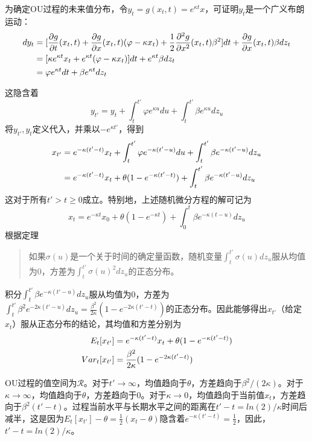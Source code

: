 \documentclass[UTF8]{ctexart}
\begin{document}
为确定OU过程的未来值分布，令$y_t=g(x_t,t)=e^{\kappa t}x$，可证明$y_t$是一个广义布朗运动：
\begin{align}
dy_t 
&=[\frac{\partial g}{\partial t}(x_t,t)+\frac{\partial g}{\partial x}(x_t,t)(\varphi-\kappa x_t)+\frac{1}{2} \frac{\partial^2 g}{\partial x^2}(x_t,t)\beta^2]dt+\frac{\partial g}{\partial x}(x_t,t)\beta dz_t \notag \\
&=[\kappa e^{\kappa t} x_t+e^{\kappa t}(\varphi-\kappa x_t)]dt+e^{\kappa t}\beta dz_t \notag  \\
&=\varphi e^{\kappa t} dt+\beta e^{\kappa t} dz_t \notag
\end{align}

这隐含着
$$y_{t'}=y_t+\int_t^{t'}\varphi e^{\kappa u}du +\int_t^{t'}\beta e^{\kappa u}dz_u$$
将$y_{t'},y_t$定义代入，并乘以$-e^{\kappa t'}$，得到
\begin{align}	
x_{t'}
&=e^{-\kappa (t'-t)}x_t+\int_t^{t'}\varphi e^{-\kappa (t'-u)}du+\int_t^{t'}\beta e^{-\kappa (t'-u)}dz_u
 \notag \\
&=e^{-\kappa (t'-t)}x_t+\theta(1-e^{-\kappa (t'-t)})+\int_t^{t'}\beta e^{-\kappa (t'-u)}dz_u
\notag
\end{align}
这对于所有$t' > t \geqslant 0$成立。特别地，上述随机微分方程的解可记为
$$x_t=e^{-\kappa t}x_0+\theta(1-e^{-\kappa t})+\int_0^t \beta e^{-\kappa (t-u)}dz_u$$
根据定理
\begin{quote}
\kaishu
如果$\sigma(u)$是一个关于时间的确定量函数，随机变量$\int_t^{t'}\sigma(u) dz_u$服从均值为0，方差为$\int_t^{t'}\sigma(u)^2 dz_u$的正态分布。
\end{quote}
积分$\int_t^{t'}\beta e^{-\kappa (t'-u)}dz_u$服从均值为0，方差为$\int_t^{t'}\beta^2 e^{-2\kappa (t'-u)}dz_u=\frac{\beta^2}{2 \kappa}(1-e^{-2 \kappa(t'-t)})$的正态分布。因此能够得出$x_{t'}$（给定$x_t$）服从正态分布的结论，其均值和方差分别为
\begin{align}
E_t[x_{t'}] &= e^{-\kappa (t'-t)}x_t+\theta(1-e^{-\kappa (t'-t)}) \notag \\
Var_t[x_{t'}] &=\frac{\beta^2}{2 \kappa}(1-e^{-2 \kappa(t'-t)}) \notag
\end{align}

OU过程的值空间为$\mathscr{R}$。对于$t' \rightarrow \infty$，均值趋向于$\theta$，方差趋向于$\beta^2/(2\kappa)$。对于$\kappa \rightarrow \infty$，均值趋向于$\theta$，方差趋向于0。对于$\kappa \rightarrow 0$，均值趋向于当前值$x_t$，方差趋向于$\beta^2(t'-t)$。过程当前水平与长期水平之间的距离在$t'-t=ln(2)/\kappa$时间后减半，这是因为$E_t[x_{t'}]-\theta=\frac{1}{2}(x_t-\theta)$隐含着$e^{-\kappa(t'-t)}=\frac{1}{2}$，因此，$t'-t=ln(2)/\kappa$。
\end{document}
